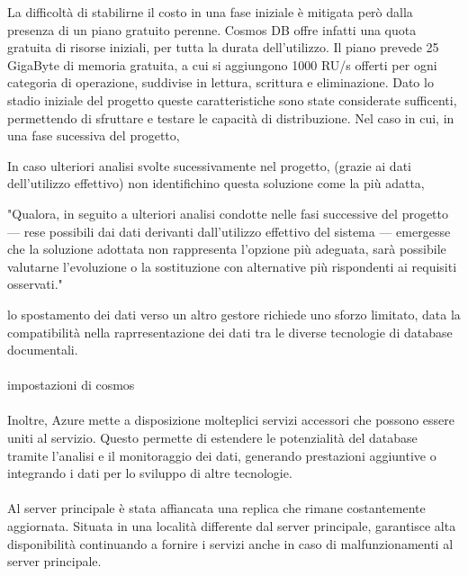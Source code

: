La difficoltà di stabilirne il costo in una fase iniziale
è mitigata però dalla presenza di un piano gratuito perenne.
Cosmos DB offre infatti una quota gratuita di risorse iniziali,
per tutta la durata dell'utilizzo.
Il piano prevede 25 GigaByte di memoria gratuita,
a cui si aggiungono 1000 RU/s offerti per ogni categoria di operazione, 
suddivise in lettura, scrittura e eliminazione. 
Dato lo stadio iniziale del progetto queste caratteristiche sono state considerate sufficenti,
permettendo di sfruttare e testare le capacità di distribuzione.
Nel caso in cui, in una fase sucessiva del progetto,

In caso ulteriori analisi svolte sucessivamente nel progetto,
(grazie ai dati dell'utilizzo effettivo)
non identifichino questa soluzione come la più adatta, 

"Qualora, in seguito a ulteriori analisi condotte nelle fasi successive del progetto — rese possibili dai dati derivanti dall’utilizzo effettivo del sistema — emergesse che la soluzione adottata non rappresenta l’opzione più adeguata, sarà possibile valutarne l’evoluzione o la sostituzione con alternative più rispondenti ai requisiti osservati."

lo spostamento dei dati verso un altro gestore richiede uno sforzo limitato,
data la compatibilità nella raprresentazione dei dati tra le diverse tecnologie di database documentali.\\
\\
impostazioni di cosmos\\
\\


Inoltre, Azure mette a disposizione molteplici servizi accessori che possono essere uniti al servizio.
Questo permette di estendere le potenzialità del database tramite  l’analisi e il monitoraggio dei dati,
generando prestazioni aggiuntive o integrando i dati per lo sviluppo di altre tecnologie.\\
\\

Al server principale è stata affiancata una replica che rimane costantemente aggiornata.
Situata in una località differente dal server principale,
garantisce alta disponibilità continuando a fornire i servizi anche in caso di malfunzionamenti al server principale.\\
\\

